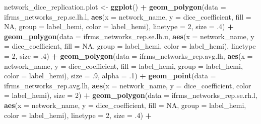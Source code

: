 \documentclass[
]{article}
\newenvironment{Shaded}{\begin{snugshade}}{\end{snugshade}}
\newcommand{\DataTypeTok}[1]{\textcolor[rgb]{0.13,0.29,0.53}{#1}}
\newcommand{\DecValTok}[1]{\textcolor[rgb]{0.00,0.00,0.81}{#1}}
\newcommand{\FloatTok}[1]{\textcolor[rgb]{0.00,0.00,0.81}{#1}}
\newcommand{\KeywordTok}[1]{\textcolor[rgb]{0.13,0.29,0.53}{\textbf{#1}}}
\newcommand{\NormalTok}[1]{#1}
\newcommand{\OperatorTok}[1]{\textcolor[rgb]{0.81,0.36,0.00}{\textbf{#1}}}
\newcommand{\OtherTok}[1]{\textcolor[rgb]{0.56,0.35,0.01}{#1}}
\newcommand{\StringTok}[1]{\textcolor[rgb]{0.31,0.60,0.02}{#1}}
\begin{document}
\begin{Shaded}
\begin{Highlighting}[]
{{{{{{{{{{{{\NormalTok{network_dice_replication.plot <-}\StringTok{ }\KeywordTok{ggplot}\NormalTok{() }\OperatorTok{+}\StringTok{  }
\StringTok{  }\KeywordTok{geom_polygon}\NormalTok{(}\DataTypeTok{data =}\NormalTok{ ifrms_networks_rep.se.lh.l, }
               \KeywordTok{aes}\NormalTok{(}\DataTypeTok{x =}\NormalTok{ network_name, }\DataTypeTok{y =}\NormalTok{ dice_coefficient, }\DataTypeTok{fill =} \OtherTok{NA}\NormalTok{, }\DataTypeTok{group =}\NormalTok{ label_hemi, }\DataTypeTok{color =}\NormalTok{ label_hemi), }
               \DataTypeTok{linetype =} \DecValTok{2}\NormalTok{, }\DataTypeTok{size =} \FloatTok{.4}\NormalTok{) }\OperatorTok{+}\StringTok{ }
\StringTok{  }\KeywordTok{geom_polygon}\NormalTok{(}\DataTypeTok{data =}\NormalTok{ ifrms_networks_rep.se.lh.u, }
               \KeywordTok{aes}\NormalTok{(}\DataTypeTok{x =}\NormalTok{ network_name, }\DataTypeTok{y =}\NormalTok{ dice_coefficient, }\DataTypeTok{fill =} \OtherTok{NA}\NormalTok{, }\DataTypeTok{group =}\NormalTok{ label_hemi, }\DataTypeTok{color =}\NormalTok{ label_hemi), }
               \DataTypeTok{linetype =} \DecValTok{2}\NormalTok{, }\DataTypeTok{size =} \FloatTok{.4}\NormalTok{) }\OperatorTok{+}
\StringTok{  }\KeywordTok{geom_polygon}\NormalTok{(}\DataTypeTok{data =}\NormalTok{ ifrms_networks_rep.avg.lh, }
               \KeywordTok{aes}\NormalTok{(}\DataTypeTok{x =}\NormalTok{ network_name, }\DataTypeTok{y =}\NormalTok{ dice_coefficient, }\DataTypeTok{fill =}\NormalTok{ label_hemi, }\DataTypeTok{group =}\NormalTok{ label_hemi, }
                   \DataTypeTok{color =}\NormalTok{ label_hemi), }
               \DataTypeTok{size =} \FloatTok{.9}\NormalTok{, }\DataTypeTok{alpha =} \FloatTok{.1}\NormalTok{) }\OperatorTok{+}
\StringTok{  }\KeywordTok{geom_point}\NormalTok{(}\DataTypeTok{data =}\NormalTok{ ifrms_networks_rep.avg.lh, }
             \KeywordTok{aes}\NormalTok{(}\DataTypeTok{x =}\NormalTok{ network_name, }\DataTypeTok{y =}\NormalTok{ dice_coefficient, }\DataTypeTok{color =}\NormalTok{ label_hemi), }
             \DataTypeTok{size =} \DecValTok{2}\NormalTok{) }\OperatorTok{+}\StringTok{ }
\StringTok{  }
\StringTok{  }
\StringTok{  }\KeywordTok{geom_polygon}\NormalTok{(}\DataTypeTok{data =}\NormalTok{ ifrms_networks_rep.se.rh.l, }
               \KeywordTok{aes}\NormalTok{(}\DataTypeTok{x =}\NormalTok{ network_name, }\DataTypeTok{y =}\NormalTok{ dice_coefficient, }\DataTypeTok{fill =} \OtherTok{NA}\NormalTok{, }\DataTypeTok{group =}\NormalTok{ label_hemi, }\DataTypeTok{color =}\NormalTok{ label_hemi), }
               \DataTypeTok{linetype =} \DecValTok{2}\NormalTok{, }\DataTypeTok{size =} \FloatTok{.4}\NormalTok{) }\OperatorTok{+}\StringTok{ }
}}}}}}}}}}}}
\end{Highlighting}
\end{Shaded}
\end{document}
